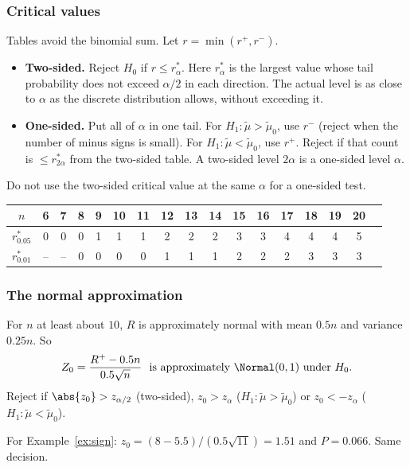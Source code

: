 \subsubsection*{Critical values}

Tables avoid the binomial sum. Let $r=\min(r^+,r^-)$.
\begin{itemize}
  \item \textbf{Two-sided.} Reject $H_0$ if $r\le r^*_\alpha$. Here $r^*_\alpha$ is the largest value whose tail probability does not exceed $\alpha/2$ in each direction. The actual level is as close to $\alpha$ as the discrete distribution allows, without exceeding it.
  \item \textbf{One-sided.} Put all of $\alpha$ in one tail. For $H_1:\tilde\mu>\tilde\mu_0$, use $r^-$ (reject when the number of minus signs is small). For $H_1:\tilde\mu<\tilde\mu_0$, use $r^+$. Reject if that count is $\le r^*_{2\alpha}$ from the two-sided table. A two-sided level $2\alpha$ is a one-sided level $\alpha$.
\end{itemize}
Do not use the two-sided critical value at the same $\alpha$ for a one-sided test.

\begin{center}
\small
\begin{tabular}{c|cccccccccccccccc}
\toprule
$n$ & 6 & 7 & 8 & 9 & 10 & 11 & 12 & 13 & 14 & 15 & 16 & 17 & 18 & 19 & 20\\
\midrule
$r^*_{0.05}$ & 0 & 0 & 0 & 1 & 1 & 1 & 2 & 2 & 2 & 3 & 3 & 4 & 4 & 4 & 5\\
$r^*_{0.01}$ & -- & -- & 0 & 0 & 0 & 0 & 1 & 1 & 1 & 2 & 2 & 2 & 3 & 3 & 3\\
\bottomrule
\end{tabular}
\end{center}

\subsubsection*{The normal approximation}

For $n$ at least about $10$, $R$ is approximately normal with mean $0.5n$ and variance $0.25n$. So
\[ Z_0=\frac{R^+-0.5n}{0.5\sqrt n}\ \text{ is approximately }\Normal(0,1)\text{ under }H_0. \]
Reject if $\abs{z_0}>z_{\alpha/2}$ (two-sided), $z_0>z_\alpha$ ($H_1:\tilde\mu>\tilde\mu_0$) or $z_0<-z_\alpha$ ($H_1:\tilde\mu<\tilde\mu_0$).

For Example~\ref{ex:sign}: $z_0=(8-5.5)/(0.5\sqrt{11})=1.51$ and $P=0.066$. Same decision.

